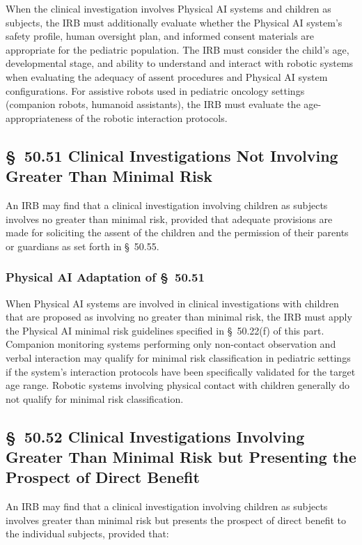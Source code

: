 When the clinical investigation involves Physical AI systems and children as subjects, the IRB must additionally evaluate whether the Physical AI system's safety profile, human oversight plan, and informed consent materials are appropriate for the pediatric population. The IRB must consider the child's age, developmental stage, and ability to understand and interact with robotic systems when evaluating the adequacy of assent procedures and Physical AI system configurations. For assistive robots used in pediatric oncology settings (companion robots, humanoid assistants), the IRB must evaluate the age-appropriateness of the robotic interaction protocols.

\subsection{\S~50.51 Clinical Investigations Not Involving Greater Than Minimal Risk}

An IRB may find that a clinical investigation involving children as subjects involves no greater than minimal risk, provided that adequate provisions are made for soliciting the assent of the children and the permission of their parents or guardians as set forth in \S~50.55.

\subsubsection{Physical AI Adaptation of \S~50.51}

When Physical AI systems are involved in clinical investigations with children that are proposed as involving no greater than minimal risk, the IRB must apply the Physical AI minimal risk guidelines specified in \S~50.22(f) of this part. Companion monitoring systems performing only non-contact observation and verbal interaction may qualify for minimal risk classification in pediatric settings if the system's interaction protocols have been specifically validated for the target age range. Robotic systems involving physical contact with children generally do not qualify for minimal risk classification.

\subsection{\S~50.52 Clinical Investigations Involving Greater Than Minimal Risk but Presenting the Prospect of Direct Benefit}

An IRB may find that a clinical investigation involving children as subjects involves greater than minimal risk but presents the prospect of direct benefit to the individual subjects, provided that:

